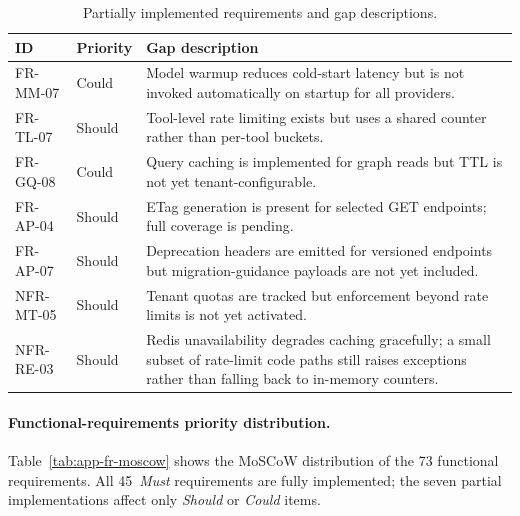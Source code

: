 \documentclass[a4paper]{sapthesis}
\begin{document}
\begin{table}[ht]
\centering
\caption{Partially implemented requirements and gap descriptions.}
\label{tab:app-partial-reqs}
\small
\begin{tabularx}{\textwidth}{@{}l l X@{}}
    \hline
    \textbf{ID} & \textbf{Priority} & \textbf{Gap description} \\
    \hline
    FR-MM-07 & Could & Model warmup reduces cold-start latency but
        is not invoked automatically on startup for all providers. \\
    FR-TL-07 & Should & Tool-level rate limiting exists but uses a
        shared counter rather than per-tool buckets. \\
    FR-GQ-08 & Could & Query caching is implemented for graph reads
        but TTL is not yet tenant-configurable. \\
    FR-AP-04 & Should & ETag generation is present for selected GET
        endpoints; full coverage is pending. \\
    FR-AP-07 & Should & Deprecation headers are emitted for
        versioned endpoints but migration-guidance payloads are not
        yet included. \\
    NFR-MT-05 & Should & Tenant quotas are tracked but enforcement
        beyond rate limits is not yet activated. \\
    NFR-RE-03 & Should & Redis unavailability degrades caching
        gracefully; a small subset of rate-limit code paths still
        raises exceptions rather than falling back to in-memory
        counters. \\
    \hline
\end{tabularx}
\end{table}

\paragraph{Functional-requirements priority distribution.}
Table~\ref{tab:app-fr-moscow} shows the MoSCoW distribution of the 73
functional requirements.  All 45~\emph{Must} requirements are fully
implemented; the seven partial implementations affect only
\emph{Should} or \emph{Could} items.
\end{document}
